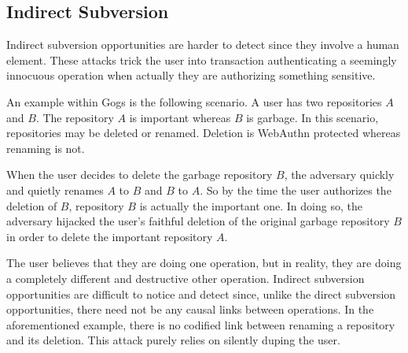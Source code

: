 \subsection{Indirect Subversion}
Indirect subversion opportunities are harder to detect since they involve a human element. These attacks trick the user into transaction authenticating a seemingly innocuous operation when actually they are authorizing something sensitive. 

An example within Gogs is the following scenario. A user has two repositories $A$ and $B$. The repository $A$ is important whereas $B$ is garbage. In this scenario, repositories may be deleted or renamed. Deletion is WebAuthn protected whereas renaming is not.

When the user decides to delete the garbage repository $B$, the adversary quickly and quietly renames $A$ to $B$ and $B$ to $A$. So by the time the user authorizes the deletion of $B$, repository $B$ is actually the important one. In doing so, the adversary hijacked the user's faithful deletion of the original garbage repository $B$ in order to delete the important repository $A$. 

\iffalse
While the user is in the process of deleting a repository $B$, 
\fi

The user believes that they are doing one operation, but in reality, they are doing a completely different and destructive other operation. Indirect subversion opportunities are difficult to notice and detect since, unlike the direct subversion opportunities, there need not be any causal links between operations. In the aforementioned example, there is no codified link between renaming a repository and its deletion. This attack purely relies on silently duping the user.


